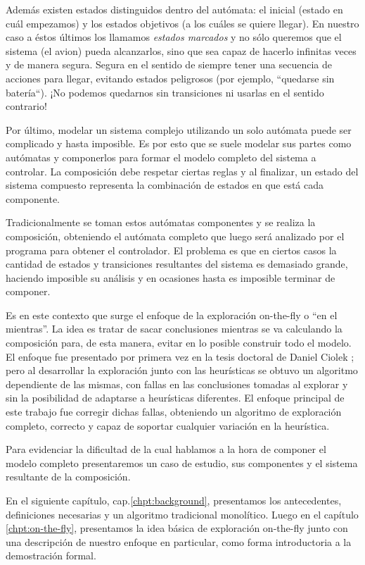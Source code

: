 Además existen estados distinguidos dentro del autómata: el inicial (estado en cuál empezamos) y los estados objetivos (a los cuáles se quiere llegar). En nuestro caso a éstos últimos los llamamos \textit{estados marcados} y no sólo queremos que el sistema (el avion) pueda alcanzarlos, sino que sea capaz de hacerlo infinitas veces y de manera segura. Segura en el sentido de siempre tener una secuencia de acciones para llegar, evitando estados peligrosos (por ejemplo, ``quedarse sin batería``). ¡No podemos quedarnos sin transiciones ni usarlas en el sentido contrario!

Por último, modelar un sistema complejo utilizando un solo autómata puede ser complicado y hasta imposible. Es por esto que se suele modelar sus partes como autómatas y componerlos para formar el modelo completo del sistema a controlar. La composición debe respetar ciertas reglas y al finalizar, un estado del sistema compuesto representa la combinación de estados en que está cada componente.

Tradicionalmente se toman estos autómatas componentes y se realiza la composición, obteniendo el autómata completo que luego será analizado por el programa para obtener el controlador. El problema es que en ciertos casos la cantidad de estados y transiciones resultantes del sistema es demasiado grande, haciendo imposible su análisis y en ocasiones hasta es imposible terminar de componer.

Es en este contexto que surge el enfoque de la exploración on-the-fly o ``en el mientras''. La idea es tratar de sacar conclusiones mientras se va calculando la composición para, de esta manera, evitar en lo posible construir todo el modelo. El enfoque fue presentado por primera vez en la tesis doctoral de Daniel Ciolek \cite{tesisDani}; pero al desarrollar la exploración junto con las heurísticas se obtuvo un algoritmo dependiente de las mismas, con fallas en las conclusiones tomadas al explorar y sin la posibilidad de adaptarse a heurísticas diferentes. El enfoque principal de este trabajo fue corregir dichas fallas, obteniendo un algoritmo de exploración completo, correcto y capaz de soportar cualquier variación en la heurística. 

Para evidenciar la dificultad de la cual hablamos a la hora de componer el modelo completo presentaremos un caso de estudio, sus componentes y el sistema resultante de la composición.

En el siguiente capítulo, cap.\ref{chpt:background}, presentamos los antecedentes, definiciones necesarias y un algoritmo tradicional monolítico. Luego en el capítulo \ref{chpt:on-the-fly}, presentamos la idea básica de exploración on-the-fly junto con una descripción de nuestro enfoque en particular, como forma introductoria a la demostración formal.

